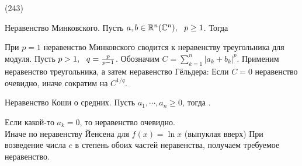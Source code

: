 (243)

\T \q Неравенство Минковского. Пусть $a, b \in \mathbb{R}^n(\mathbb{C}^n),\ \  p \ge 1$. Тогда 

\D При $p = 1$ неравенство Минковского сводится к неравенству треугольника для модуля. Пусть $p > 1,\ \  q = \frac p{p - 1}$. Обозначим $C = \sum\limits^n_{k = 1}|a_k + b_k|^p$. Применим неравенство треугольника, а затем неравенство Гёльдера:
 
 Если $C = 0$ неравенство очевидно, иначе сократим на $C^{1/q}$.

\T \q Неравенство Коши о средних. Пусть $a_1, \cdots, a_n \ge 0$, тогда .

\D Если какой-то $a_k = 0$, то неравенство очевидно.\\
Иначе по неравенству Йенсена для $f(x) = \ln x$ (выпуклая вверх)  При возведение числа $e$ в степень обоих частей неравенства, получаем требуемое неравенство.